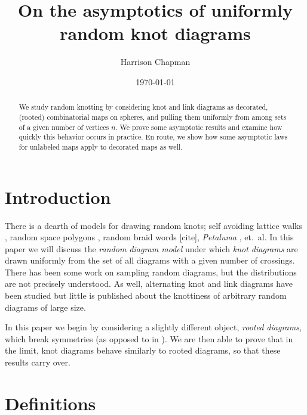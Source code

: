 \documentclass[amsmath,longbibliography,secnumarabic,floatfix,amssymb,nofootinbib,nobibnotes,letterpaper,11pt,tightenlines,notitlepage,showkeys,showlabels]{amsart}%
\begin{document}
\title[]{On the asymptotics of uniformly random knot diagrams} \author{Harrison Chapman}
 \address{Department of Mathematics\\University of Georgia, Athens
  GA}
\date{\today}


\begin{abstract}
  We study random knotting by considering knot and link diagrams as
  decorated, (rooted) combinatorial maps on spheres, and pulling them
  uniformly from among sets of a given number of vertices $n$. We
  prove some asymptotic results and examine how quickly this behavior
  occurs in practice. En route, we show how some asymptotic laws for
  unlabeled maps apply to decorated maps as well.
\end{abstract}
\maketitle

\section{Introduction}
\label{sec:intro}

There is a dearth of models for drawing random knots; self avoiding
lattice walks \cite{Sumners_1988}, random space polygons
\cite{Cantarella_2015,Cantarella_2013}, random braid words [cite],
\emph{Petaluma} \cite{1411.3308v2}, et.\ al. In this paper we will
discuss the \emph{random diagram model} under which \emph{knot
  diagrams} are drawn uniformly from the set of all diagrams with a
given number of crossings. There has been some work on sampling random
diagrams\cite{doi:10.1142/9789812703460_0023}, but the distributions
are not precisely understood.  As well, alternating knot and link
diagrams have been studied \cite{PZJasympconj2004} but little is
published about the knottiness of arbitrary random diagrams of large
size.

In this paper we begin by considering a slightly different object,
\emph{rooted diagrams}, which break symmetries (as opposed to in
\cite{CCMknotdiagrams2015}). We are then able to prove that in the
limit, knot diagrams behave similarly to rooted diagrams, so that
these results carry over.

\section{Definitions}
\label{sec:defns}
\end{document}
